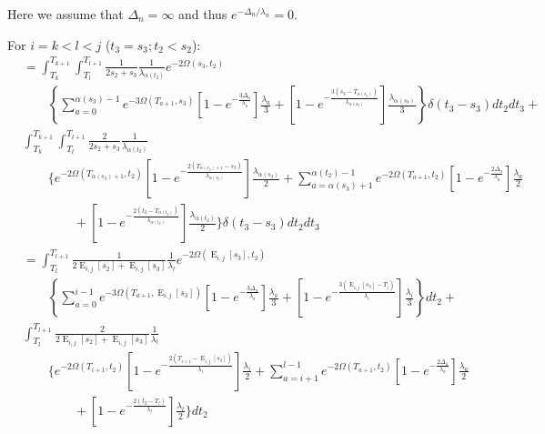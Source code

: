 \documentclass{article}
\DeclareMathOperator{\E}{E}
\begin{document}
Here we assume that $\Delta_n = \infty$ and thus $e^{-\Delta_n/\lambda_n} = 0$.

For $i=k<l<j$ ($t_3=s_3; t_2<s_2$): %
\begin{align*}
    &=\int_{T_k}^{T_{k+1}}\int_{T_l}^{T_{l+1}}\frac{1}{2s_2+s_3}\frac{1}{\lambda_{\alpha(t_2)}}e^{-2\Omega(s_3,t_2)}\\
    &\qquad\left\{\sum_{a=0}^{\alpha(s_3)-1}e^{-3\Omega(T_{a+1},s_3)}
        \left[1-e^{-\frac{3\Delta_a}{\lambda_a}}\right]\frac{\lambda_a}{3}+
    \left[1-e^{-\frac{3\left(s_3-T_{\alpha(s_3)}\right)}{\lambda_{\alpha(s_3)}}}\right]
        \frac{\lambda_{\alpha(s_3)}}{3}\right\}\delta(t_3-s_3)dt_2dt_3+\\
        &\int_{T_k}^{T_{k+1}}\int_{T_l}^{T_{l+1}}\frac{2}{2s_2+s_3}\frac{1}{\lambda_{\alpha(t_2)}}\\
    &\qquad\Bigg\{e^{-2\Omega(T_{\alpha(s_3)+1},t_2)}\left[1-e^{-\frac{2\left(T_{\alpha(s_3)+1}-s_3\right)}{\lambda_{\alpha(s_3)}}}\right]\frac{\lambda_{\alpha(s_3)}}{2}+\sum_{a=\alpha(s_3)+1}^{\alpha(t_2)-1}e^{-2\Omega\left(T_{a+1},t_2\right)}\left[1-e^{-\frac{2\Delta_a}{\lambda_a}}\right]\frac{\lambda_a}{2}\\
    &\qquad\qquad+\left[1-e^{-\frac{2\left(t_2-T_{\alpha(t_2)}\right)}{\lambda_{\alpha(t_2)}}}\right]\frac{\lambda_{\alpha(t_2)}}{2}
    \Bigg\}\delta(t_3-s_3)dt_2dt_3\\[2em]
    &=\int_{T_l}^{T_{l+1}}\frac{1}{2\E_{i,j}[s_2]+\E_{i,j}[s_3]}\frac{1}{\lambda_l}e^{-2\Omega(\E_{i,j}[s_3],t_2)}\\
    &\qquad\left\{\sum_{a=0}^{i-1}e^{-3\Omega(T_{a+1},\E_{i,j}[s_3])}
        \left[1-e^{-\frac{3\Delta_a}{\lambda_a}}\right]\frac{\lambda_a}{3}+
    \left[1-e^{-\frac{3\left(\E_{i,j}[s_3]-T_{i}\right)}{\lambda_{i}}}\right]
        \frac{\lambda_{i}}{3}\right\}dt_2+\\
        &\int_{T_l}^{T_{l+1}}\frac{2}{2\E_{i,j}[s_2]+\E_{i,j}[s_3]}\frac{1}{\lambda_{l}}\\
    &\qquad\Bigg\{e^{-2\Omega(T_{i+1},t_2)}\left[1-e^{-\frac{2\left(T_{i+1}-\E_{i,j}[s_3]\right)}{\lambda_{i}}}\right]\frac{\lambda_{i}}{2}+\sum_{a=i+1}^{l-1}e^{-2\Omega\left(T_{a+1},t_2\right)}\left[1-e^{-\frac{2\Delta_a}{\lambda_a}}\right]\frac{\lambda_a}{2}\\
    &\qquad\qquad+\left[1-e^{-\frac{2\left(t_2-T_{l}\right)}{\lambda_{l}}}\right]\frac{\lambda_{l}}{2}
    \Bigg\}dt_2\\[2em]

\end{align*}
\end{document}
